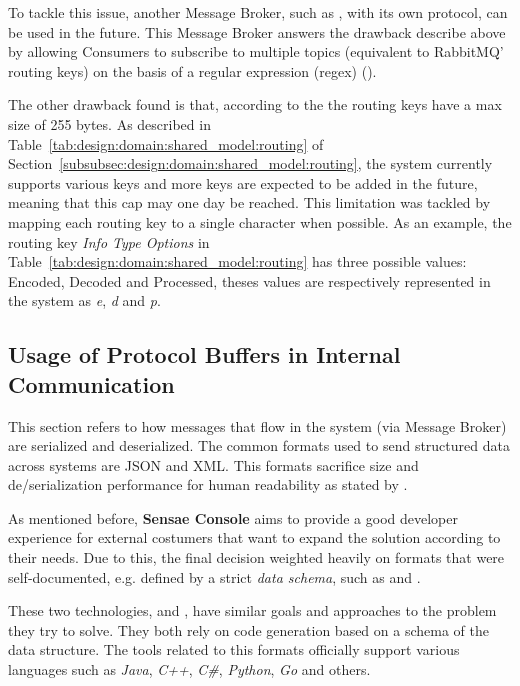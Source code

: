 To tackle this issue, another Message Broker, such as , with its own protocol, can be used in the future. This Message Broker answers the drawback describe above by allowing Consumers to subscribe to multiple topics (equivalent to RabbitMQ' routing keys) on the basis of a regular expression (regex) ().

The other drawback found is that, according to the  the routing keys have a max size of 255 bytes. As described in Table~\ref{tab:design:domain:shared_model:routing} of Section~\ref{subsubsec:design:domain:shared_model:routing}, the system currently supports various keys and more keys are expected to be added in the future, meaning that this cap may one day be reached. This limitation was tackled by mapping each routing key to a single character when possible. As an example, the routing key \textit{Info Type Options} in Table~\ref{tab:design:domain:shared_model:routing} has three possible values: Encoded, Decoded and Processed, theses values are respectively represented in the system as \textit{e}, \textit{d} and \textit{p}.

\subsection{Usage of Protocol Buffers in Internal Communication}
\label{subsec:implementation:decisions:proto}

This section refers to how messages that flow in the system (via Message Broker) are serialized and deserialized. The common formats used to send structured data across systems are \gls{JSON} and \gls{XML}. This formats sacrifice size and de/serialization performance for human readability as stated by \cite{sumaray2012comparison}.

As mentioned before, \textbf{Sensae Console} aims to provide a good developer experience for external costumers that want to expand the solution according to their needs. Due to this, the final decision weighted heavily on formats that were self-documented, e.g. defined by a strict \textit{data schema}, such as  and .

These two technologies,  and , have similar goals and approaches to the problem they try to solve. They both rely on code generation based on a schema of the data structure. The tools related to this formats officially support various languages such as \textit{Java}, \textit{C++}, \textit{C\#}, \textit{Python}, \textit{Go} and others.

